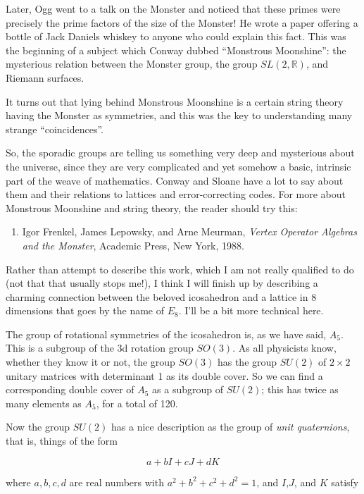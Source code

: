 \documentclass{article}
\def\tightlist{}
\begin{document}
Later, Ogg went to a talk on the Monster and noticed that these primes
were precisely the prime factors of the size of the Monster! He wrote a
paper offering a bottle of Jack Daniels whiskey to anyone who could
explain this fact. This was the beginning of a subject which Conway
dubbed ``Monstrous Moonshine'': the mysterious relation between the
Monster group, the group \(SL(2,\mathbb{R})\), and Riemann surfaces.

It turns out that lying behind Monstrous Moonshine is a certain string
theory having the Monster as symmetries, and this was the key to
understanding many strange ``coincidences''.

So, the sporadic groups are telling us something very deep and
mysterious about the universe, since they are very complicated and yet
somehow a basic, intrinsic part of the weave of mathematics. Conway and
Sloane have a lot to say about them and their relations to lattices and
error-correcting codes. For more about Monstrous Moonshine and string
theory, the reader should try this:

\begin{enumerate}
\def\labelenumi{\arabic{enumi})}
\setcounter{enumi}{1}
\tightlist
\item
  Igor Frenkel, James Lepowsky, and Arne Meurman, \emph{Vertex Operator
  Algebras and the Monster}, Academic Press, New York, 1988.
\end{enumerate}

Rather than attempt to describe this work, which I am not really
qualified to do (not that that usually stops me!), I think I will finish
up by describing a charming connection between the beloved icosahedron
and a lattice in 8 dimensions that goes by the name of \(E_8\). I'll be
a bit more technical here.

The group of rotational symmetries of the icosahedron is, as we have
said, \(A_5\). This is a subgroup of the 3d rotation group \(SO(3)\). As
all physicists know, whether they know it or not, the group \(SO(3)\)
has the group \(SU(2)\) of \(2\times2\) unitary matrices with
determinant 1 as its double cover. So we can find a corresponding double
cover of \(A_5\) as a subgroup of \(SU(2)\); this has twice as many
elements as \(A_5\), for a total of 120.

Now the group \(SU(2)\) has a nice description as the group of
\emph{unit quaternions}, that is, things of the form

\[a + bI + cJ + dK\]

where \(a,b,c,d\) are real numbers with \(a^2 + b^2 + c^2 + d^2 = 1\),
and \(I\),\(J\), and \(K\) satisfy
\end{document}
